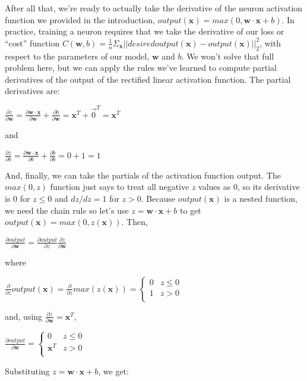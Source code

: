 \documentclass[11pt]{article}
\begin{document}
After all that, we're ready to actually take the derivative of the neuron activation function we provided in the introduction, $output(\mathbf{x}) = max(0, \mathbf{w} \cdot \mathbf{x} + b)$.  In practice, training a neuron requires that we take the derivative of our loss  or ``cost'' function $C(\mathbf{w},b) = \frac{1}{n} \Sigma_{\mathbf{x}} ||desiredoutput(\mathbf{x}) - output(\mathbf{x})||_2^2$, with respect to the parameters of our model, $\mathbf{w}$ and $b$.  We won't solve that full problem here, but we can apply the rules we've learned to compute partial derivatives of the output of the rectified linear activation function. The partial derivatives are:

$\frac{\partial z}{\partial \mathbf{w}} = \frac{\partial \mathbf{w} \cdot \mathbf{x}}{\partial \mathbf{w}} + \frac{\partial b}{\partial \mathbf{w}} = \mathbf{x}^T + \vec{0}^T = \mathbf{x}^T$

and

$\frac{\partial z}{\partial b} = \frac{\partial \mathbf{w} \cdot \mathbf{x}}{\partial b} + \frac{\partial b}{\partial b} = 0 + 1 = 1$

And, finally, we can take the partials of the activation function output. The $max(0,z)$ function just says to treat all negative $z$ values as 0, so its derivative is 0 for $z \leq 0$ and $dz/dz = 1$ for $z > 0$. Because $output(\mathbf{x})$ is a nested function, we need the chain rule so let's use $z = \mathbf{w} \cdot \mathbf{x} + b$ to get $output(\mathbf{x}) = max(0,z(\mathbf{x}))$. Then,

$\frac{\partial output}{\partial \mathbf{w}} = \frac{\partial output}{\partial z}\frac{\partial z}{\partial \mathbf{w}}$

where

$\frac{\partial}{\partial z} output(\mathbf{x}) = \frac{\partial}{\partial z} max(z(\mathbf{x})) = \begin{cases}
	0 & z \leq 0\\
	1 & z > 0\\
\end{cases}
$

and, using $\frac{\partial z}{\partial \mathbf{w}} = \mathbf{x}^T$,

$\frac{\partial output}{\partial \mathbf{w}} = \begin{cases}
	0 & z \leq 0\\
	\mathbf{x}^T & z > 0\\
\end{cases}
$

Substituting $z = \mathbf{w} \cdot \mathbf{x} + b$, we get:
\end{document}
